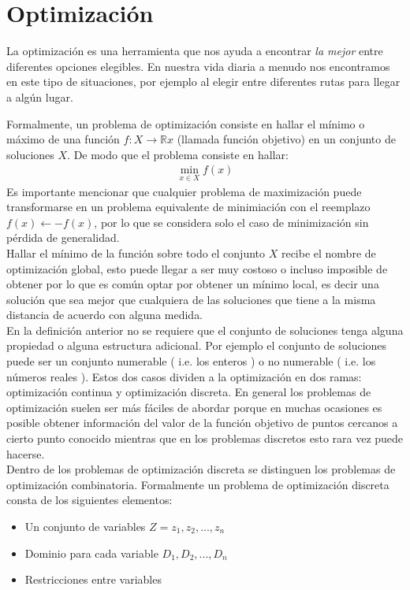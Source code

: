 \section{Optimización}
La optimización es una herramienta que nos ayuda a encontrar \textit{la mejor} entre diferentes opciones elegibles. En nuestra vida diaria a menudo nos encontramos en este tipo de situaciones, por ejemplo al elegir entre diferentes rutas para llegar a algún lugar.

Formalmente, un problema de optimización consiste en hallar el mínimo o máximo de una función $f:X\rightarrow \mathbb{R}x$ (llamada función objetivo) en un conjunto de soluciones $X$. De modo que el problema consiste en hallar:
\begin{gather}
\min_{x\in X} f(x)
\end{gather}
Es importante mencionar que cualquier problema de maximización puede transformarse en un problema equivalente de minimiación con el reemplazo $f(x) \leftarrow -f(x)$, por lo que se considera solo el caso de minimización sin pérdida de generalidad.\\

Hallar el mínimo de la función sobre todo el conjunto $X$ recibe el nombre de optimización global, esto puede llegar a ser muy costoso o incluso imposible de obtener por lo que es común optar por obtener un mínimo local, es decir una solución que sea mejor que cualquiera de las soluciones que tiene a la misma distancia de acuerdo con alguna medida.
\\ En la definición anterior no se requiere que el conjunto de soluciones tenga alguna propiedad o alguna estructura adicional. Por ejemplo el conjunto de soluciones puede ser un conjunto numerable ( i.e. los enteros ) o no numerable ( i.e. los números reales ). Estos dos casos dividen a la optimización en dos ramas: optimización continua y optimización discreta. En general los problemas de optimización suelen ser más fáciles de abordar\cite{nocedal2006numerical} porque en muchas ocasiones es posible obtener información del valor de la función objetivo de puntos cercanos a cierto punto conocido mientras que en los problemas discretos esto rara vez puede hacerse.\\

Dentro de los problemas de optimización discreta se distinguen los problemas de optimización combinatoria. Formalmente un problema de optimización discreta consta de los siguientes elementos\cite{Blum2003}:
\begin{itemize}
    \item Un conjunto de variables $Z={z_1,z_2,...,z_n}$
    \item Dominio para cada variable $D_1,D_2,...,D_n$
    \item Restricciones entre variables
\end{itemize}

